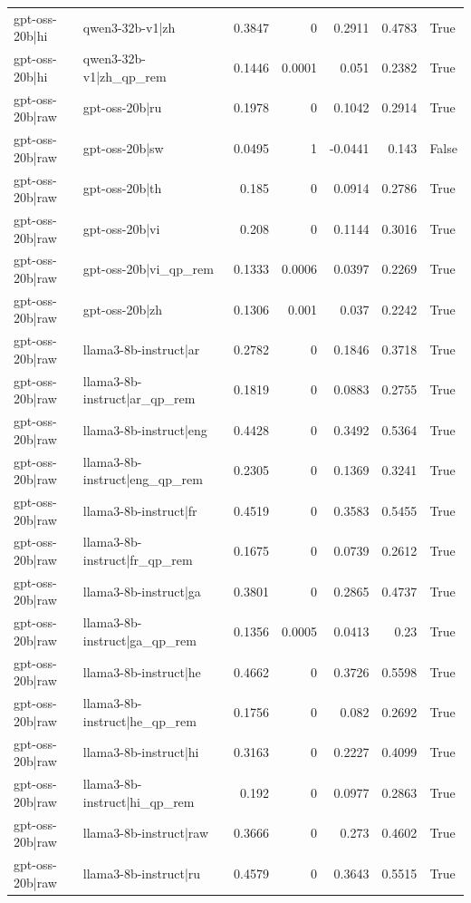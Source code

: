\begin{table}
\begin{tabular}{l l r r r r l}
gpt-oss-20b|hi & qwen3-32b-v1|zh & 0.3847 & 0 & 0.2911 & 0.4783 & True \\
gpt-oss-20b|hi & qwen3-32b-v1|zh_qp_rem & 0.1446 & 0.0001 & 0.051 & 0.2382 & True \\
gpt-oss-20b|raw & gpt-oss-20b|ru & 0.1978 & 0 & 0.1042 & 0.2914 & True \\
gpt-oss-20b|raw & gpt-oss-20b|sw & 0.0495 & 1 & -0.0441 & 0.143 & False \\
gpt-oss-20b|raw & gpt-oss-20b|th & 0.185 & 0 & 0.0914 & 0.2786 & True \\
gpt-oss-20b|raw & gpt-oss-20b|vi & 0.208 & 0 & 0.1144 & 0.3016 & True \\
gpt-oss-20b|raw & gpt-oss-20b|vi_qp_rem & 0.1333 & 0.0006 & 0.0397 & 0.2269 & True \\
gpt-oss-20b|raw & gpt-oss-20b|zh & 0.1306 & 0.001 & 0.037 & 0.2242 & True \\
gpt-oss-20b|raw & llama3-8b-instruct|ar & 0.2782 & 0 & 0.1846 & 0.3718 & True \\
gpt-oss-20b|raw & llama3-8b-instruct|ar_qp_rem & 0.1819 & 0 & 0.0883 & 0.2755 & True \\
gpt-oss-20b|raw & llama3-8b-instruct|eng & 0.4428 & 0 & 0.3492 & 0.5364 & True \\
gpt-oss-20b|raw & llama3-8b-instruct|eng_qp_rem & 0.2305 & 0 & 0.1369 & 0.3241 & True \\
gpt-oss-20b|raw & llama3-8b-instruct|fr & 0.4519 & 0 & 0.3583 & 0.5455 & True \\
gpt-oss-20b|raw & llama3-8b-instruct|fr_qp_rem & 0.1675 & 0 & 0.0739 & 0.2612 & True \\
gpt-oss-20b|raw & llama3-8b-instruct|ga & 0.3801 & 0 & 0.2865 & 0.4737 & True \\
gpt-oss-20b|raw & llama3-8b-instruct|ga_qp_rem & 0.1356 & 0.0005 & 0.0413 & 0.23 & True \\
gpt-oss-20b|raw & llama3-8b-instruct|he & 0.4662 & 0 & 0.3726 & 0.5598 & True \\
gpt-oss-20b|raw & llama3-8b-instruct|he_qp_rem & 0.1756 & 0 & 0.082 & 0.2692 & True \\
gpt-oss-20b|raw & llama3-8b-instruct|hi & 0.3163 & 0 & 0.2227 & 0.4099 & True \\
gpt-oss-20b|raw & llama3-8b-instruct|hi_qp_rem & 0.192 & 0 & 0.0977 & 0.2863 & True \\
gpt-oss-20b|raw & llama3-8b-instruct|raw & 0.3666 & 0 & 0.273 & 0.4602 & True \\
gpt-oss-20b|raw & llama3-8b-instruct|ru & 0.4579 & 0 & 0.3643 & 0.5515 & True \\

\end{tabular}
\end{table}
